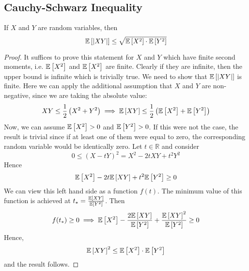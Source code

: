 \subsection{Cauchy-Schwarz Inequality}
\begin{theorem}
	If \(X\) and \(Y\) are random variables, then
	\[ \mathbb{E}\left[{\abs{XY}}\right] \leq \sqrt{\mathbb{E}\left[{X^2}\right]\cdot\mathbb{E}\left[{Y^2}\right]} \]
\end{theorem}
\begin{proof}
	It suffices to prove this statement for \(X\) and \(Y\) which have finite second moments, i.e. \(\mathbb{E}\left[{X^2}\right]\) and \(\mathbb{E}\left[{X^2}\right]\) are finite. Clearly if they are infinite, then the upper bound is infinite which is trivially true. We need to show that \(\mathbb{E}\left[{\abs{XY}}\right]\) is finite. Here we can apply the additional assumption that \(X\) and \(Y\) are non-negative, since we are taking the absolute value:
	\[ XY \leq \frac{1}{2}\left(X^2 + Y^2\right) \implies \mathbb{E}\left[{XY}\right] \leq \frac{1}{2}\left( \mathbb{E}\left[{X^2}\right] + \mathbb{E}\left[{Y^2}\right]  \right) \]
	Now, we can assume \(\mathbb{E}\left[{X^2}\right] > 0\) and \(\mathbb{E}\left[{Y^2}\right] > 0\). If this were not the case, the result is trivial since if at least one of them were equal to zero, the corresponding random variable would be identically zero. Let \(t \in \mathbb R\) and consider
	\[ 0 \leq (X - tY)^2 = X^2 - 2tXY + t^2Y^2 \]
	Hence
	\[ \mathbb{E}\left[{X^2}\right] - 2t\mathbb{E}\left[{XY}\right] + t^2\mathbb{E}\left[{Y^2}\right] \geq 0 \]
	We can view this left hand side as a function \(f(t)\). The minimum value of this function is achieved at \(t_\ast = \frac{\mathbb{E}\left[{XY}\right]}{\mathbb{E}\left[{Y^2}\right]}\). Then
	\[ f(t_\ast) \geq 0 \implies \mathbb{E}\left[{X^2}\right] - \frac{2\mathbb{E}\left[{XY}\right]}{\mathbb{E}\left[{Y^2}\right]} + \frac{\mathbb{E}\left[{XY}\right]^2}{\mathbb{E}\left[{Y^2}\right]} \geq 0 \]
	Hence,
	\[ \mathbb{E}\left[{XY}\right]^2 \leq \mathbb{E}\left[{X^2}\right]\cdot \mathbb{E}\left[{Y^2}\right] \]
	and the result follows.
\end{proof}
